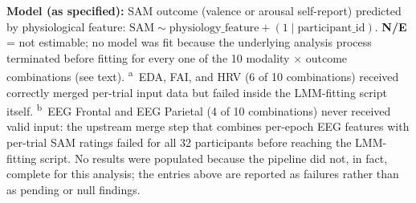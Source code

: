 \begin{table}[htbp]
    \noindent\parbox{\linewidth}{\scriptsize \textbf{Model (as specified):} SAM outcome (valence or arousal self-report) predicted by physiological feature: $\text{SAM} \sim \text{physiology\_feature} + (1 \mid \text{participant\_id})$. \textbf{N/E} = not estimable; no model was fit because the underlying analysis process terminated before fitting for every one of the 10 modality $\times$ outcome combinations (see text). \textsuperscript{a}~EDA, \gls{FAI}, and \gls{HRV} (6 of 10 combinations) received correctly merged per-trial input data but failed inside the LMM-fitting script itself. \textsuperscript{b}~EEG Frontal and EEG Parietal (4 of 10 combinations) never received valid input: the upstream merge step that combines per-epoch EEG features with per-trial SAM ratings failed for all 32 participants before reaching the LMM-fitting script. No results were populated because the pipeline did not, in fact, complete for this analysis; the entries above are reported as failures rather than as pending or null findings.}
\end{table}

